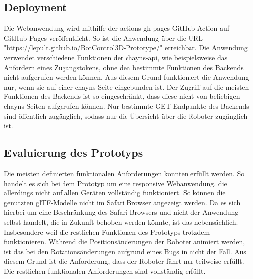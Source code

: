 
\subsection{Deployment}

Die Webanwendung wird mithilfe der actions-gh-pages GitHub Action auf GitHub Pages veröffentlicht. So ist die Anwendung über die \ac{URL} "https://lepult.github.io/BotControl3D-Prototype/" erreichbar. Die Anwendung verwendet verschiedene Funktionen der chayns-api, wie beispielsweise das Anfordern eines Zugangstokens, ohne den bestimmte Funktionen des Backends nicht aufgerufen werden können. Aus diesem Grund funktioniert die Anwendung nur, wenn sie auf einer chayns Seite eingebunden ist. Der Zugriff auf die meisten Funktionen des Backends ist so eingeschränkt, dass diese nicht von beliebigen chayns Seiten aufgerufen können. Nur bestimmte GET-Endpunkte des Backends sind öffentlich zugänglich, sodass nur die Übersicht über die Roboter zugänglich ist.

\subsection{Evaluierung des Prototyps}
Die meisten definierten funktionalen Anforderungen konnten erfüllt werden. So handelt es sich bei dem Prototyp um eine responsive Webanwendung, die allerdings nicht auf allen Geräten vollständig funktioniert. So können die genutzten \ac{glTF}-Modelle nicht im Safari Browser angezeigt werden. Da es sich hierbei um eine Beschränkung des Safari-Browsers und nicht der Anwendung selbst handelt, die in Zukunft behoben werden könnte, ist das nebensächlich. Insbesondere weil die restlichen Funktionen des Prototyps trotzdem funktionieren. Während die Positionsänderungen der Roboter animiert werden, ist das bei den Rotationsänderungen aufgrund eines Bugs in \deckgl{} nicht der Fall. Aus diesem Grund ist die Anforderung, dass der Roboter fährt nur teilweise erfüllt. Die restlichen funktionalen Anforderungen sind vollständig erfüllt.




